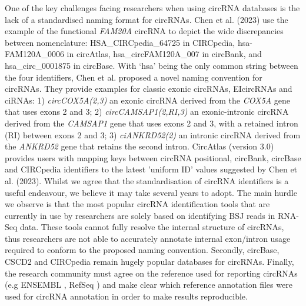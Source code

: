 \documentclass[journal,review,submit,pdftex,moreauthors]{Definitions/mdpi}
\begin{document}
One of the key challenges facing researchers when using circRNA databases is the lack of a standardised naming format for circRNAs. Chen et al. (2023) \cite{Chen2023Jan} use the example of the functional \textit{FAM20A} circRNA to depict the wide discrepancies between nomenclature: HSA\_CIRCpedia\_64725 in CIRCpedia, hsa-FAM120A\_0006 in circAtlas, hsa\_circFAM120A\_007 in circBank, and hsa\_circ\_0001875 in circBase. With `hsa' being the only common string between the four identifiers, Chen et al. proposed a novel naming convention for circRNAs. They provide examples for classic exonic circRNAs, EIcircRNAs and ciRNAs: 1) \textit{circCOX5A(2,3)} an exonic circRNA derived from the \textit{COX5A} gene that uses exons 2 and 3; 2) \textit{circCAMSAP1(2,RI,3)} an exonic-intronic circRNA derived from the \textit{CAMSAP1} gene that uses exons 2 and 3, with a retained intron (RI) between exons 2 and 3; 3) \textit{ciANKRD52(2)} an intronic circRNA derived from the \textit{ANKRD52} gene that retains the second intron. CircAtlas (version 3.0) \cite{circatlas3} provides users with mapping keys between circRNA positional, circBank, circBase and CIRCpedia identifiers to the latest 'uniform ID' values suggested by Chen et al. (2023). Whilst we agree that the standardisation of circRNA identifiers is a useful endeavour, we believe it may take several years to adopt. The main hurdle we observe is that the most popular circRNA identification tools that are currently in use by researchers are solely based on identifying BSJ reads in RNA-Seq data. These tools cannot fully resolve the internal structure of circRNAs, thus researchers are not able to accurately annotate internal exon/intron usage required to conform to the proposed naming convention. Secondly, circBase, CSCD2 and CIRCpedia remain hugely popular databases for circRNAs. Finally, the research community must agree on the reference used for reporting circRNAs (e.g ENSEMBL \cite{ENSEMBL2023}, RefSeq \cite{RefSeq}) and make clear which reference annotation files were used for circRNA annotation in order to make results reproducible.
\end{document}
